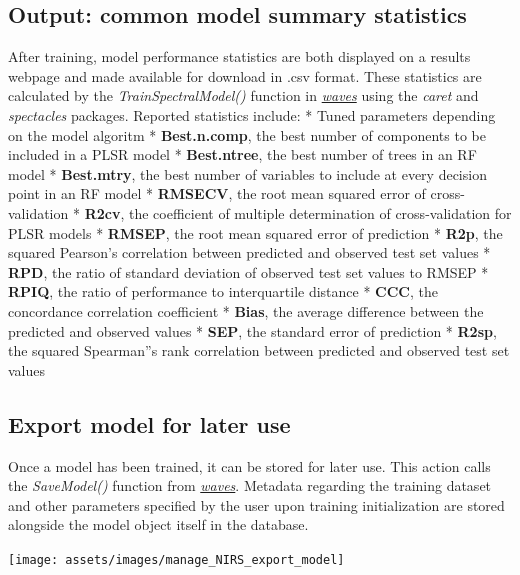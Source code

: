 \documentclass[
  12pt,
]{book}
\begin{document}
\hypertarget{output-common-model-summary-statistics}{%
\subsection{Output: common model summary statistics}\label{output-common-model-summary-statistics}}

After training, model performance statistics are both displayed on a results webpage and made available for download in .csv format. These statistics are calculated by the \emph{TrainSpectralModel()} function in \href{https://CRAN.R-project.org/package=waves}{\emph{waves}} using the \emph{caret} and \emph{spectacles} packages. Reported statistics include: * Tuned parameters depending on the model algoritm * \textbf{Best.n.comp}, the best number of components to be included in a PLSR model * \textbf{Best.ntree}, the best number of trees in an RF model * \textbf{Best.mtry}, the best number of variables to include at every decision point in an RF model * \textbf{RMSECV}, the root mean squared error of cross-validation * \textbf{R2cv}, the coefficient of multiple determination of cross-validation for PLSR models * \textbf{RMSEP}, the root mean squared error of prediction * \textbf{R2p}, the squared Pearson's correlation between predicted and observed test set values * \textbf{RPD}, the ratio of standard deviation of observed test set values to RMSEP * \textbf{RPIQ}, the ratio of performance to interquartile distance * \textbf{CCC}, the concordance correlation coefficient * \textbf{Bias}, the average difference between the predicted and observed values * \textbf{SEP}, the standard error of prediction * \textbf{R2sp}, the squared Spearman''s rank correlation between predicted and observed test set values

\hypertarget{export-model-for-later-use}{%
\subsection{Export model for later use}\label{export-model-for-later-use}}

Once a model has been trained, it can be stored for later use. This action calls the \emph{SaveModel()} function from \href{https://CRAN.R-project.org/package=waves}{\emph{waves}}. Metadata regarding the training dataset and other parameters specified by the user upon training initialization are stored alongside the model object itself in the database.

\begin{center}\texttt{[image: assets/images/manage\_NIRS\_export\_model]} \end{center}
\end{document}
